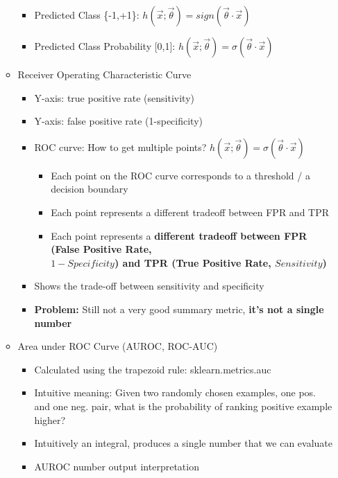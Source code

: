 \documentclass[10pt, oneside]{article}
\begin{document}
\begin{itemize}
\begin{itemize}
\begin{itemize}
            \item Predicted Class \{-1,+1\}: $h(\vec x;\vec \theta) = sign(\vec \theta \cdot \vec x)$ 
            \item Predicted Class Probability [0,1]: $h(\vec x;\vec \theta) = \sigma (\vec \theta \cdot \vec x)$ 
        \end{itemize}
        \item Receiver Operating Characteristic Curve
        \begin{itemize}
            \item Y-axis: true positive rate (sensitivity)
            \item Y-axis: false positive rate (1-specificity)
            \item ROC curve: How to get multiple points? $h(\vec x;\vec \theta) = \sigma (\vec \theta \cdot \vec x)$ 
            \begin{itemize}
                \item Each point on the ROC curve corresponds to a threshold / a decision boundary
                \item Each point represents a different tradeoff between FPR and TPR
                \item Each point represents a \textbf{different tradeoff between FPR (False Positive Rate, \\$1-Specificity$) and TPR (True Positive Rate, $Sensitivity$)}
            \end{itemize}
            \item Shows the trade-off between sensitivity and specificity
            \item \textbf{Problem:} Still not a very good summary metric, \textbf{it's not a single number}
        \end{itemize}
        \item Area under ROC Curve (AUROC, ROC-AUC)
        \begin{itemize}
            \item Calculated using the trapezoid rule: sklearn.metrics.auc
            \item Intuitive meaning: Given two randomly chosen examples, one pos. and one neg. pair, what is the probability of ranking positive example higher?
            \item Intuitively an integral, produces a single number that we can evaluate
            \item AUROC number output interpretation
            \begin{itemize}

\end{itemize}
\end{itemize}
\end{itemize}
\end{itemize}
\end{document}
